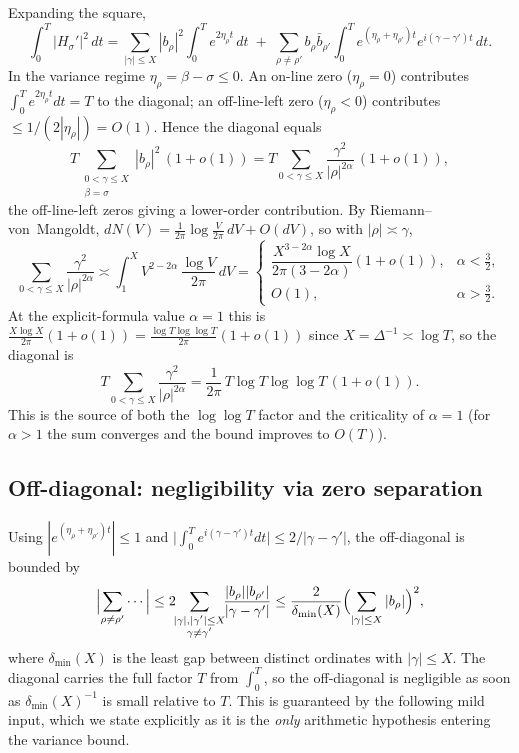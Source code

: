 Expanding the square,
\[
\int_0^T|H_\sigma'|^2\,dt
=\sum_{|\gamma|\le X}|b_\rho|^2\!\int_0^T\! e^{2\eta_\rho t}\,dt
\;+\;\sum_{\rho\ne\rho'} b_\rho\bar b_{\rho'}\!\int_0^T\! e^{(\eta_\rho+\eta_{\rho'})t}e^{i(\gamma-\gamma')t}\,dt .
\]
In the variance regime $\eta_\rho=\beta-\sigma\le0$.  An on-line zero
($\eta_\rho=0$) contributes $\int_0^T e^{2\eta_\rho t}dt=T$ to the diagonal;
an off-line-left zero ($\eta_\rho<0$) contributes $\le 1/(2|\eta_\rho|)=O(1)$.
Hence the diagonal equals
\[
T\!\!\sum_{\substack{0<\gamma\le X\\ \beta=\sigma}}\!\!|b_\rho|^2\,(1+o(1))
=T\!\!\sum_{0<\gamma\le X}\!\frac{\gamma^2}{|\rho|^{2\alpha}}\,(1+o(1)),
\]
the off-line-left zeros giving a lower-order contribution.  By
Riemann--von~Mangoldt, $dN(V)=\tfrac{1}{2\pi}\log\tfrac{V}{2\pi}\,dV+O(dV)$, so
with $|\rho|\asymp\gamma$,
\[
\sum_{0<\gamma\le X}\frac{\gamma^2}{|\rho|^{2\alpha}}
\asymp\int_1^X V^{2-2\alpha}\,\frac{\log V}{2\pi}\,dV
=\begin{cases}\dfrac{X^{3-2\alpha}\log X}{2\pi(3-2\alpha)}(1+o(1)), & \alpha<\tfrac32,\\[6pt] O(1), & \alpha>\tfrac32.\end{cases}
\]
At the explicit-formula value $\alpha=1$ this is
$\frac{X\log X}{2\pi}(1+o(1))=\frac{\log T\log\log T}{2\pi}(1+o(1))$ since
$X=\Delta^{-1}\asymp\log T$, so the diagonal is
\begin{equation}
T\sum_{0<\gamma\le X}\frac{\gamma^2}{|\rho|^{2\alpha}}
=\frac{1}{2\pi}\,T\log T\log\log T\,(1+o(1)).
\label{eq:diag-main}
\end{equation}
This is the source of both the $\log\log T$ factor and the criticality of
$\alpha=1$ (for $\alpha>1$ the sum converges and the bound improves to $O(T)$).

\subsection{Off-diagonal: negligibility via zero separation}

Using $|e^{(\eta_\rho+\eta_{\rho'})t}|\le1$ and
$\bigl|\int_0^T e^{i(\gamma-\gamma')t}dt\bigr|\le 2/|\gamma-\gamma'|$, the
off-diagonal is bounded by
\[
\Bigl|\sum_{\rho\ne\rho'}\cdots\Bigr|
\le 2\!\!\sum_{\substack{|\gamma|,|\gamma'|\le X\\ \gamma\ne\gamma'}}\!\!
\frac{|b_\rho||b_{\rho'}|}{|\gamma-\gamma'|}
\le\frac{2}{\delta_{\min}(X)}\Bigl(\sum_{|\gamma|\le X}|b_\rho|\Bigr)^2 ,
\]
where $\delta_{\min}(X)$ is the least gap between distinct ordinates with
$|\gamma|\le X$.  The diagonal carries the full factor $T$ from $\int_0^T$, so
the off-diagonal is negligible as soon as $\delta_{\min}(X)^{-1}$ is small
relative to $T$.  This is guaranteed by the following mild input, which we state
explicitly as it is the \emph{only} arithmetic hypothesis entering the variance
bound.

